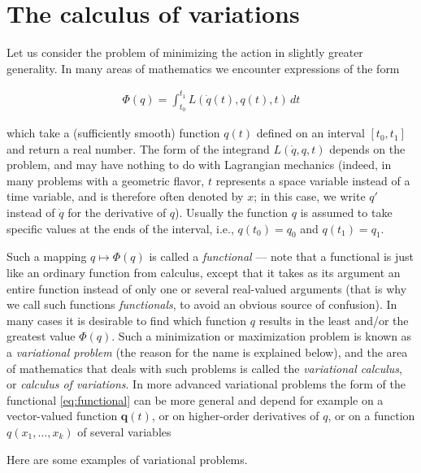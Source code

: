 \documentclass[11pt]{report}
\theoremstyle{plain}
\theoremstyle{definition}
\begin{document}
\section{The calculus of variations}
\label{sec:variational-calculus}

Let us consider the problem of minimizing the action
in slightly greater generality. In many areas of
mathematics we encounter expressions of the form

\begin{equation*} \tag{14}\label{eq:functional}
\begin{split}
\Phi(q) = \int_{t_0}^{t_1} L(\dot{q}(t),q(t),t)\,dt
\end{split}
\end{equation*}

\noindent which take a (sufficiently smooth) function $q(t)$
defined on an interval $[t_0,t_1]$ and return a real
number. The form of the integrand $L(\dot{q},q,t)$
depends on the problem, and may have nothing to do
with Lagrangian mechanics (indeed, in many problems
with a geometric flavor, $t$ represents a space
variable instead of a time variable, and is therefore
often denoted by $x$; in this case, we write $q'$
instead of $\dot{q}$ for the derivative of $q$).
Usually the function $q$ is assumed to take specific
values at the ends of the interval, i.e., $q(t_0)=q_0$
and $q(t_1)=q_1$.

Such a mapping $q\mapsto \Phi(q)$ is called a
\emph{functional} --- note that a functional is just like
an ordinary function from calculus, except that it
takes as its argument an entire function instead of
only one or several real-valued arguments (that is why
we call such functions \emph{functionals}, to avoid an
obvious source of confusion). In many cases it is
desirable to find which function $q$ results in the
least and/or the greatest value $\Phi(q)$. Such a
minimization or maximization problem is known as a
\emph{variational problem} (the reason for the name is
explained below), and the area of mathematics that
deals with such problems is called the \emph{variational
calculus}, or \emph{calculus of variations}. In more
advanced variational problems the form of the
functional \eqref{eq:functional} can be more general and
depend for example on a vector-valued function
$\mathbf{q}(t)$, or on higher-order derivatives of
$q$, or on a function $q(x_1,\ldots,x_k)$ of several
variables

Here are some examples of variational problems.
\end{document}
